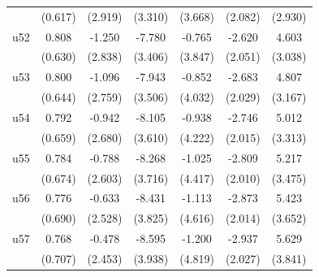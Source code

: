 \begin{table}[htbp]
\begin{tabular}{l*{6}{c}}
                    &     (0.617)         &     (2.919)         &     (3.310)         &     (3.668)         &     (2.082)         &     (2.930)         \\
\addlinespace
u52                 &       0.808         &      -1.250         &      -7.780\sym{**} &      -0.765         &      -2.620         &       4.603         \\
                    &     (0.630)         &     (2.838)         &     (3.406)         &     (3.847)         &     (2.051)         &     (3.038)         \\
\addlinespace
u53                 &       0.800         &      -1.096         &      -7.943\sym{**} &      -0.852         &      -2.683         &       4.807         \\
                    &     (0.644)         &     (2.759)         &     (3.506)         &     (4.032)         &     (2.029)         &     (3.167)         \\
\addlinespace
u54                 &       0.792         &      -0.942         &      -8.105\sym{**} &      -0.938         &      -2.746         &       5.012         \\
                    &     (0.659)         &     (2.680)         &     (3.610)         &     (4.222)         &     (2.015)         &     (3.313)         \\
\addlinespace
u55                 &       0.784         &      -0.788         &      -8.268\sym{**} &      -1.025         &      -2.809         &       5.217         \\
                    &     (0.674)         &     (2.603)         &     (3.716)         &     (4.417)         &     (2.010)         &     (3.475)         \\
\addlinespace
u56                 &       0.776         &      -0.633         &      -8.431\sym{**} &      -1.113         &      -2.873         &       5.423         \\
                    &     (0.690)         &     (2.528)         &     (3.825)         &     (4.616)         &     (2.014)         &     (3.652)         \\
\addlinespace
u57                 &       0.768         &      -0.478         &      -8.595\sym{**} &      -1.200         &      -2.937         &       5.629         \\
                    &     (0.707)         &     (2.453)         &     (3.938)         &     (4.819)         &     (2.027)         &     (3.841)         \\

\end{tabular}
\end{table}

